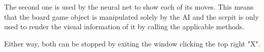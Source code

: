 The second one is used by the neural net to show each of its moves. This means that the board game object is manipulated solely by the AI and the scrpit is only used to render the visual information of it by calling the applicable methods.

Either way, both can be stopped by exiting the window clicking the top right "X".
